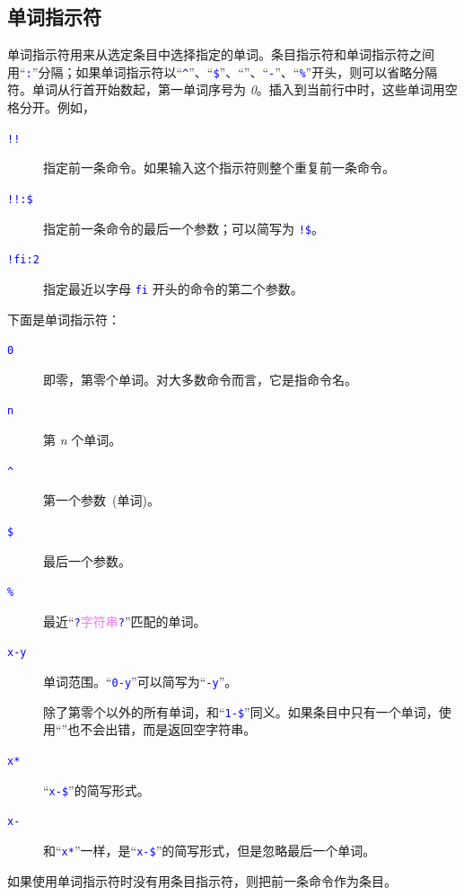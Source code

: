 \documentclass[openany,notitlepage]{book}
\newcommand{\code}[1]{\textcolor{blue}{{\tt #1}}}
\newcommand{\hl}[1]{{\sl #1}}
\newcommand{\hs}[1]{{\textcolor{violet}{#1}}}
\begin{document}
\begin{CJK}{UTF8}{song}
\subsection{单词指示符} %
单词指示符用来从选定条目中选择指定的单词。条目指示符和单词指示符之间用``\code{:}''分隔；如果单词指示符以``\code{\textasciicircum}''、``\code{\$}''、``\code{*}''、``\code{-}''、``\code{\%}''开头，则可以省略分隔符。单词从行首开始数起，第一单词序号为 \hl{0}。插入到当前行中时，这些单词用空格分开。例如，
\begin{description}
    \item[\code{!!}] 指定前一条命令。如果输入这个指示符则整个重复前一条命令。
    \item[\code{!!:\$}] 指定前一条命令的最后一个参数；可以简写为 \code{!\$}。
    \item[\code{!fi:2}] 指定最近以字母 \code{fi} 开头的命令的第二个参数。
\end{description}
下面是单词指示符：
\begin{description}
    \item[\code{0}] 即零，第零个单词。对大多数命令而言，它是指命令名。
    \item[\code{n}] 第 \hl{n} 个单词。
    \item[\code{\textasciicircum}] 第一个参数~(单词)。
    \item[\code{\$}] 最后一个参数。
    \item[\code{\%}] 最近``\code{?}\hs{字符串}\code{?}''匹配的单词。
    \item[\code{x-y}] 单词范围。``\code{0-y}''可以简写为``\code{-y}''。
    \item[\code{*}] 除了第零个以外的所有单词，和``\code{1-\$}''同义。如果条目中只有一个单词，使用``\code{*}''也不会出错，而是返回空字符串。
    \item[\code{x*}] ``\code{x-\$}''的简写形式。
    \item[\code{x-}] 和``\code{x*}''一样，是``\code{x-\$}''的简写形式，但是忽略最后一个单词。
\end{description}
如果使用单词指示符时没有用条目指示符，则把前一条命令作为条目。


\end{CJK}
\end{document}
